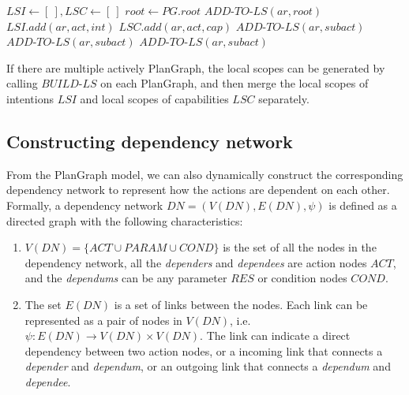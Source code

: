 {\footnotesize
\begin{algorithm}
\begin{algorithmic}[1]
	\State $LSI\gets [\:], LSC\gets [\:]$
	\State $root\gets PG.root$
	\State $ADD\textrm{-}TO\textrm{-}LS(ar, root)$
\EndProcedure
{}
   			\State $LSI.add(ar, act, int)$
   		\EndIf
	\EndFor
   			\State $LSC.add(ar, act, cap)$
   		\EndIf
	\EndFor
   			\State $ADD\textrm{-}TO\textrm{-}LS(ar, subact)$
		\EndFor
	\EndFor
   			\State $ADD\textrm{-}TO\textrm{-}LS(ar, subact)$
		\EndFor
	\EndFor
   		\State $ADD\textrm{-}TO\textrm{-}LS(ar, subact)$
	\EndFor
\EndProcedure
\end{algorithmic}
\end{algorithm}
}

If there are multiple actively PlanGraph, the local scopes can be generated by calling $BUILD\textrm{-}LS$ on each PlanGraph, and then merge the local scopes of intentions $LSI$ and local scopes of capabilities $LSC$ separately.



\subsection{Constructing dependency network} %
\label{sub:representing_dependencies}
From the PlanGraph model, we can also dynamically construct the corresponding dependency network to represent how the actions are dependent on each other. Formally, a dependency network $DN=(V(DN), E(DN), \psi)$ is defined as a directed graph with the following characteristics:
\begin{enumerate}
	\item $V(DN)=\{ACT \cup PARAM \cup COND\}$ is the set of all the nodes in the dependency network, all the \emph{dependers} and \emph{dependees} are action nodes $ACT$, and the \emph{dependums} can be any parameter $RES$ or condition nodes $COND$. 
	\item The set $E(DN)$ is a set of links between the nodes. Each link can be represented as a pair of nodes in $V(DN)$, i.e. $\psi: E(DN) \to V(DN) \times V(DN)$. The link can indicate a direct dependency between two action nodes, or a incoming link that connects a \emph{depender} and \emph{dependum}, or an outgoing link that connects a \emph{dependum} and \emph{dependee}.
\end{enumerate}

